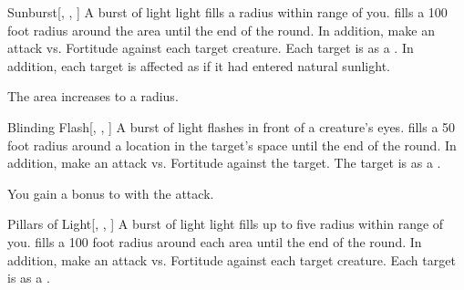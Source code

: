 \lowercase{\hypertarget{spell:Sunburst}{}}\label{spell:Sunburst}
\begin{freeability}[Rank 5]{\hypertarget{spell:Sunburst}{Sunburst}}[, , ]
A burst of light light fills a \areamed radius  within \rngmed range of you.
 fills a 100 foot radius around the area until the end of the round.
In addition, make an attack vs. Fortitude against each target creature.
\hit Each target is \dazzled as a .
In addition, each target is affected as if it had entered natural sunlight.

\rankline
{} The area increases to a \arealarge radius.
\end{freeability}
\vspace{0.25em}



\lowercase{\hypertarget{spell:Blinding Flash}{}}\label{spell:Blinding Flash}
\begin{freeability}[Rank 6]{\hypertarget{spell:Blinding Flash}{Blinding Flash}}[, , ]
A burst of light flashes in front of a creature's eyes.
 fills a 50 foot radius around a location in the target's space until the end of the round.
In addition, make an attack vs. Fortitude against the target.
\hit The target is  as a .

\rankline
{} You gain a  bonus to  with the attack.
\end{freeability}
\vspace{0.25em}



\lowercase{\hypertarget{spell:Pillars of Light}{}}\label{spell:Pillars of Light}
\begin{freeability}[Rank 7]{\hypertarget{spell:Pillars of Light}{Pillars of Light}}[, , ]
A burst of light light fills up to five \areasmall radius  within \rngmed range of you.
 fills a 100 foot radius around each area until the end of the round.
In addition, make an attack vs. Fortitude against each target creature.
\hit Each target is \dazzled as a .
\end{freeability}
\vspace{0.25em}



